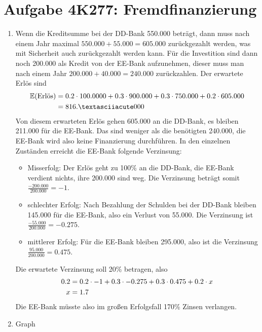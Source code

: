 \documentclass{article}
\newcommand{\E}{\mathbb{E}}
\begin{document}
	\section*{Aufgabe 4K277: Fremdfinanzierung}
	\begin{enumerate}[label=(\alph*)]
		\item Wenn die Kreditsumme bei der DD-Bank 550.000 beträgt, dann muss nach einem Jahr maximal $550.000 + 55.000 = 605.000$ zurückgezahlt werden, was mit Sicherheit auch zurückgezahlt werden kann. Für die Investition sind dann noch 200.000 als Kredit von der EE-Bank aufzunehmen, dieser muss man nach einem Jahr $200.000 + 40.000 = 240.000$ zurückzahlen. Der erwartete Erlös sind
		\begin{align}
			\E(\text{Erlös}) &= 0.2\cdot 100.0000 + 0.3\cdot 900.000 + 0.3\cdot 750.000 + 0.2\cdot 605.000 \notag \\
			&= 816.´000 \notag
		\end{align}
		Von diesem erwarteten Erlös gehen 605.000 an die DD-Bank, es bleiben 211.000 für die EE-Bank. Das sind weniger als die benötigten 240.000, die EE-Bank wird also keine Finanzierung durchführen. In den einzelnen Zuständen erreicht die EE-Bank folgende Verzinsung:
		\begin{itemize}
			\item Misserfolg: Der Erlös geht zu 100\% an die DD-Bank, die EE-Bank verdient nichts, ihre 200.000 sind weg. Die Verzinsung beträgt somit $\frac{-200.000}{200.000} = -1$.
			\item schlechter Erfolg: Nach Bezahlung der Schulden bei der DD-Bank bleiben 145.000 für die EE-Bank, also ein Verlust von 55.000. Die Verzinsung ist $\frac{-55.000}{200.000}=-0.275$.
			\item mittlerer Erfolg: Für die EE-Bank bleiben 295.000, also ist die Verzinsung $\frac{95.000}{200.000}=0.475$.
		\end{itemize}
		Die erwartete Verzinsung soll 20\% betragen, also
		\begin{align}
			0.2 &= 0.2\cdot -1 + 0.3\cdot -0.275 + 0.3 \cdot 0.475 + 0.2\cdot x \notag \\
			x &= 1.7 \notag
		\end{align}
		Die EE-Bank müsste also im großen Erfolgsfall 170\% Zinsen verlangen.
		\item Graph
		\begin{center}
\end{center}
\end{enumerate}
\end{document}
